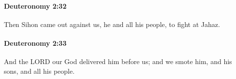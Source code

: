 		\paragraph{Deuteronomy 2:32} %
			\label{DEUTERONOMY-2-32}

			Then Sihon came out against us, he and all his people, to fight at Jahaz.


		\paragraph{Deuteronomy 2:33} %
			\label{DEUTERONOMY-2-33}

			And the LORD our God delivered him before us; and we smote him, and his sons, and all his people.


